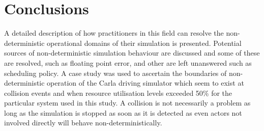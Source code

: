 \documentclass[letterpaper, 10 pt, journal, twoside]{IEEEtran}
\begin{document}

\section{Conclusions}\label{s:conclusion}
A detailed description of how practitioners in this field can resolve the non-deterministic operational domains of their simulation is presented. Potential sources of non-deterministic simulation behaviour are discussed and some of these are resolved, such as floating point error, and other are left unanswered such as scheduling policy. %
A case study was used to ascertain the boundaries of non-deterministic operation of the Carla driving simulator which seem to exist at collision events and when resource utilisation levels exceeded 50\% for the particular system used in this study. A collision is not necessarily a problem as long as the simulation is stopped as soon as it is detected as even actors not involved directly will behave non-deterministically. 




\end{document}
